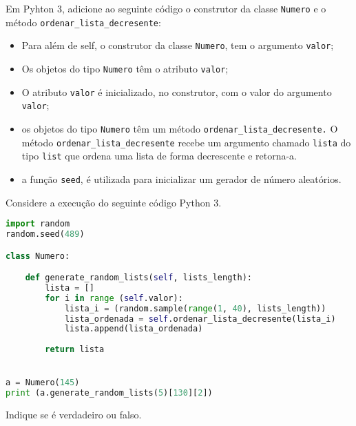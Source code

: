 \documentclass[12pt,varwidth=16cm,border=17pt]{standalone}
\begin{document}
Em Pyhton 3, adicione ao seguinte código o construtor da classe \verb+Numero+ e o método \verb+ordenar_lista_decresente+:

\begin{itemize}

  \item Para além de self, o construtor da classe \verb+Numero+, tem o argumento \verb+valor+;
  \item Os objetos do tipo \verb+Numero+ têm o atributo \verb+valor+;
  \item O atributo \verb+valor+ é inicializado, no construtor, com o valor
  do argumento \verb+valor+;
  \item os objetos do tipo \verb+Numero+ têm um método \verb+ordenar_lista_decresente.+ O
    método \verb+ordenar_lista_decresente+ recebe um argumento chamado \verb+lista+ do tipo
  \verb+list+ que ordena uma lista de forma decrescente e retorna-a.
    
  \item a função \verb+seed+, é utilizada para inicializar um gerador de número aleatórios.
    
\end{itemize}

Considere a execução do seguinte código Python 3.


\begin{lstlisting}[language=Python]
import random
random.seed(489)

class Numero:

    def generate_random_lists(self, lists_length):
        lista = []
        for i in range (self.valor):
            lista_i = (random.sample(range(1, 40), lists_length))
            lista_ordenada = self.ordenar_lista_decresente(lista_i)
            lista.append(lista_ordenada)
        
        return lista


a = Numero(145)
print (a.generate_random_lists(5)[130][2])
\end{lstlisting}

Indique se é verdadeiro ou falso.
\end{document}
